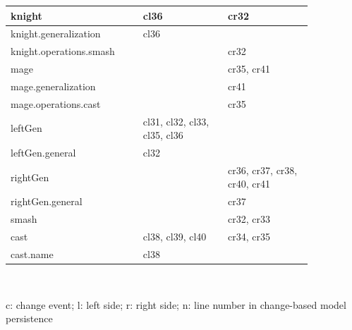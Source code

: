 \begin{table}[ht]
\begin{sffamily}
\begin{tabular}{|m{0.36\linewidth}|m{0.245\linewidth}|m{0.245\linewidth}|}
		knight                             & cl36                                      & cr32                                       \\ \hline
		knight.generalization              & cl36                                      &                                            \\ \hline
		knight.operations.smash            &                                           & cr32                                       \\ \hline
		mage                               &                                           & cr35, cr41                                 \\ \hline
		mage.generalization                &                                           & cr41                                       \\ \hline
		mage.operations.cast               &                                           & cr35                                       \\ \hline
		leftGen                            & cl31, cl32, cl33, cl35, cl36              &                                            \\ \hline
		leftGen.general                    & cl32                                      &                                            \\ \hline
		rightGen                           &                                           & cr36, cr37, cr38, cr40, cr41               \\ \hline
		rightGen.general                   &                                           & cr37                                       \\ \hline
		smash                              &                                           & cr32, cr33                                 \\ \hline
		cast                               & cl38, cl39, cl40                          & cr34, cr35                                 \\ \hline
		cast.name                          & cl38                                      &                                            \\ \hline
	\end{tabular}\\
\end{sffamily}
c: change event; l: left side; r: right side; n: line number in change-based model persistence
\end{table}

